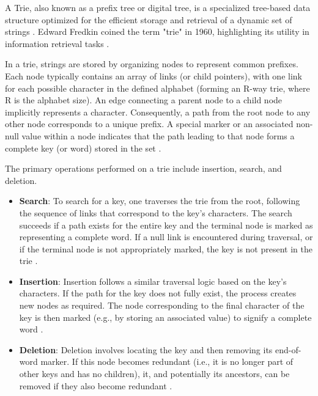 
A Trie, also known as a prefix tree or digital tree, is a specialized tree-based data structure optimized for the efficient storage and retrieval of a dynamic set of strings \cite{Knuth1998, SedgewickWayne2011}. Edward Fredkin coined the term "trie" in 1960, highlighting its utility in information retrieval tasks \cite{Fredkin1960, Knuth1998}.

In a trie, strings are stored by organizing nodes to represent common prefixes. Each node typically contains an array of links (or child pointers), with one link for each possible character in the defined alphabet (forming an R-way trie, where R is the alphabet size). An edge connecting a parent node to a child node implicitly represents a character. Consequently, a path from the root node to any other node corresponds to a unique prefix. A special marker or an associated non-null value within a node indicates that the path leading to that node forms a complete key (or word) stored in the set \cite{SedgewickWayne2011, Fredkin1960}.


The primary operations performed on a trie include insertion, search, and deletion.
\begin{itemize}
    \item \textbf{Search}: To search for a key, one traverses the trie from the root, following the sequence of links that correspond to the key's characters. The search succeeds if a path exists for the entire key and the terminal node is marked as representing a complete word. If a null link is encountered during traversal, or if the terminal node is not appropriately marked, the key is not present in the trie \cite{Knuth1998, SedgewickWayne2011}.
    \item \textbf{Insertion}: Insertion follows a similar traversal logic based on the key's characters. If the path for the key does not fully exist, the process creates new nodes as required. The node corresponding to the final character of the key is then marked (e.g., by storing an associated value) to signify a complete word \cite{SedgewickWayne2011}.
    \item \textbf{Deletion}: Deletion involves locating the key and then removing its end-of-word marker. If this node becomes redundant (i.e., it is no longer part of other keys and has no children), it, and potentially its ancestors, can be removed if they also become redundant \cite{Fredkin1960, SedgewickWayne2011}.
\end{itemize}

